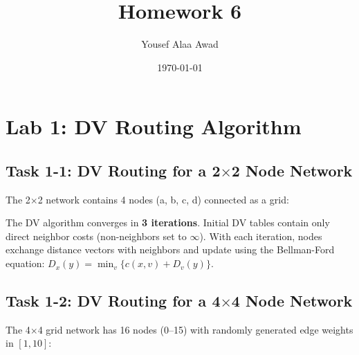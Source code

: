 \documentclass[12pt, letterpaper]{article}
\title{\textbf{Homework 6}}
\author{Yousef Alaa Awad}
\date{\today}
\newcommand{\lab}[1]{\section*{Lab #1}}
\newcommand{\task}[1]{\subsection*{Task #1}}
\begin{document}
\maketitle

\lab{1: DV Routing Algorithm}

\task{1-1: DV Routing for a 2$\times$2 Node Network}

The 2$\times$2 network contains 4 nodes (a, b, c, d) connected as a grid:

\begin{center}
\end{center}

The DV algorithm converges in \textbf{3 iterations}. Initial DV tables contain only direct neighbor costs (non-neighbors set to $\infty$). With each iteration, nodes exchange distance vectors with neighbors and update using the Bellman-Ford equation:
$D_x(y) = \min_v\{c(x,v) + D_v(y)\}$.




\task{1-2: DV Routing for a 4$\times$4 Node Network}

The 4$\times$4 grid network has 16 nodes (0--15) with randomly generated edge weights in $[1, 10]$:
\end{document}
